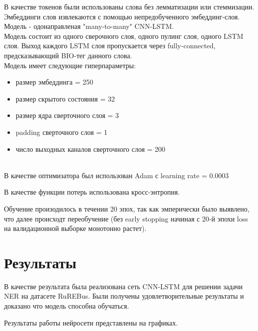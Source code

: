 \documentclass{article}
\begin{document}
\vspace{14pt}

В качестве токенов были использованы слова без лемматизации или стеммизации. \\ %

Эмбеддинги слов извлекаются с помощью непредобученного эмбеддинг-слоя. \\

Модель - одонаправленая "many-to-many"  CNN-LSTM. \\

Модель состоит из одного сверочного слоя, одного пулинг слоя, одного LSTM слоя. Выход каждого LSTM слоя пропускается через fully-connected, предсказывающий BIO-тег данного слова. \\

Модель имеет следующие гиперпараметры:
\begin{itemize}
    \item размер эмбеддинга = 250
    \item размер скрытого состояния = 32 
    \item размер ядра сверточного слоя = 3
    \item padding сверточного слоя = 1
    \item число выходных каналов сверточного слоя = 200
\end{itemize}

\\

В качестве оптимизатора был использован Adam с learning rate = 0.0003

В качестве функции потерь использована кросс-энтропия.

Обучение произодилось в течении 20 эпох, так как эмперически было выявлено, что далее происходт переобучение (без early stopping начиная с 20-й эпохи loss на валидационной выборке монотонно растет).

\section{Результаты}
В качестве результата была реализована сеть CNN-LSTM для решении задачи NER на датасете RuREBus. Были получены удовлетворительные результаты и доказано что модель способна обучаться.

Результаты работы нейросети представлены на графиках.
\end{document}
